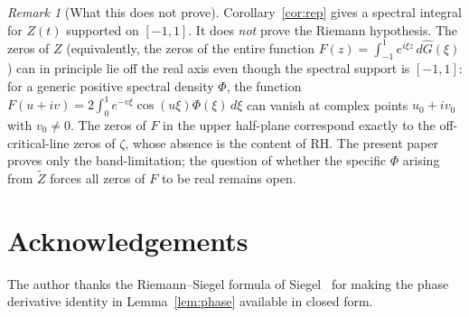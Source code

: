 \documentclass[12pt]{amsart}
\theoremstyle{definition}
\theoremstyle{remark}
\newtheorem{remark}[theorem]{Remark}
\newcommand{\Zt}{\widetilde{Z}}
\begin{document}
\begin{remark}[What this does not prove]
\label{rem:gap}
Corollary~\ref{cor:rep} gives a spectral integral for $Z(t)$
supported on $[-1,1]$.  It does \emph{not} prove the Riemann hypothesis.
The zeros of $Z$ (equivalently, the zeros of the entire function
$F(z)=\int_{-1}^1 e^{i\xi z}\,d\hat G(\xi)$) can in principle lie off
the real axis even though the spectral support is $[-1,1]$: for a
generic positive spectral density $\Phi$, the function $F(u+iv)=
2\int_0^1 e^{-v\xi}\cos(u\xi)\Phi(\xi)\,d\xi$ can vanish at
complex points $u_0+iv_0$ with $v_0\ne 0$.  The zeros of $F$ in the
upper half-plane correspond exactly to the off-critical-line zeros of
$\zeta$, whose absence is the content of RH.  The present paper proves
only the band-limitation; the question of whether the specific $\Phi$
arising from $\Zt$ forces all zeros of $F$ to be real remains open.
\end{remark}

\section*{Acknowledgements}

The author thanks the Riemann--Siegel formula of Siegel~\cite{Siegel1932}
for making the phase derivative identity in Lemma~\ref{lem:phase}
available in closed form.
\end{document}
